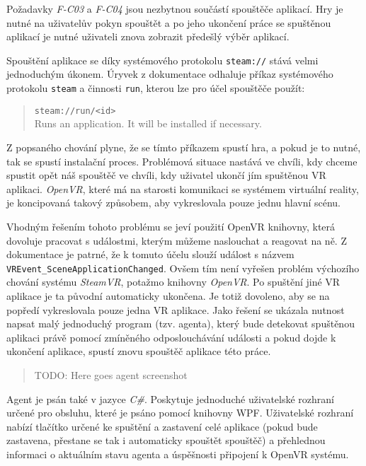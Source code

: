 Požadavky \emph{F-C03} a \emph{F-C04} jsou nezbytnou součástí spouštěče
aplikací. Hry je nutné na uživatelův pokyn spouštět a po jeho ukončení
práce se spuštěnou aplikací je nutné uživateli znova zobrazit předešlý
výběr aplikací.

Spouštění aplikace se díky systémového protokolu \texttt{steam://} stává
velmi jednoduchým úkonem. Úryvek z dokumentace odhaluje příkaz
systémového protokolu \texttt{steam} a činnosti \texttt{run}, kterou lze
pro účel spouštěče použít:

\begin{quote}
\texttt{steam://run/\textless{}id\textgreater{}}\\
Runs an application. It will be installed if necessary.
\end{quote}

Z popsaného chování plyne, že se tímto příkazem spustí hra, a pokud je
to nutné, tak se spustí instalační proces. Problémová situace nastává ve
chvíli, kdy chceme spustit opět náš spouštěč ve chvíli, kdy uživatel
ukončí jím spuštěnou VR aplikaci. \emph{OpenVR}, které má na starosti
komunikaci se systémem virtuální reality, je koncipovaná takový
způsobem, aby vykreslovala pouze jednu hlavní scénu.

Vhodným řešením tohoto problému se jeví použití OpenVR knihovny, která
dovoluje pracovat s událostmi, kterým můžeme naslouchat a reagovat na
ně. Z dokumentace je patrné, že k tomuto účelu slouží událost s názvem
\texttt{VREvent\_SceneApplicationChanged}. Ovšem tím není vyřešen
problém výchozího chování systému \emph{SteamVR}, potažmo knihovny
\emph{OpenVR}. Po spuštění jiné VR aplikace je ta původní automaticky
ukončena. Je totiž dovoleno, aby se na popředí vykreslovala pouze jedna
VR aplikace. Jako řešení se ukázala nutnost napsat malý jednoduchý
program (tzv. agenta), který bude detekovat spuštěnou aplikaci právě
pomocí zmíněného odposlouchávání události a pokud dojde k ukončení
aplikace, spustí znovu spouštěč aplikace této práce.

\begin{quote}
TODO: Here goes agent screenshot
\end{quote}

Agent je psán také v jazyce \emph{C\#}. Poskytuje jednoduché uživatelské
rozhraní určené pro obsluhu, které je psáno pomocí knihovny WPF.
Uživatelské rozhraní nabízí tlačítko určené ke spuštění a zastavení celé
aplikace (pokud bude zastavena, přestane se tak i automaticky spouštět
spouštěč) a přehlednou informaci o aktuálním stavu agenta a úspěšnosti
připojení k OpenVR systému.

